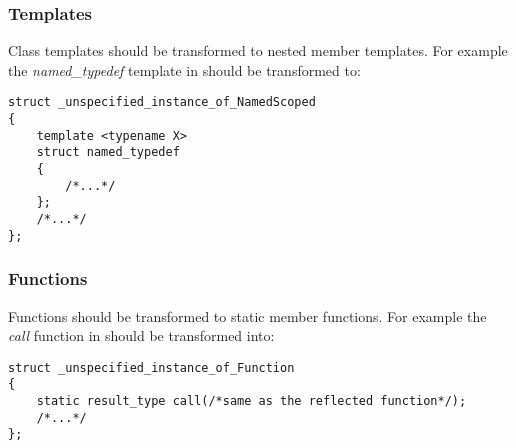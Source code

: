 \subsubsection{Templates}

Class templates should be transformed to nested member templates.
For example the {\em named\_typedef} template in {}
should be transformed to:
\begin{verbatim}
struct _unspecified_instance_of_NamedScoped
{
	template <typename X>
	struct named_typedef
	{
		/*...*/
	};
	/*...*/
};
\end{verbatim}

\subsubsection{Functions}

Functions should be transformed to static member functions.
For example the {\em call} function in {}
should be transformed into:
\begin{verbatim}
struct _unspecified_instance_of_Function
{
	static result_type call(/*same as the reflected function*/);
	/*...*/
};
\end{verbatim}

